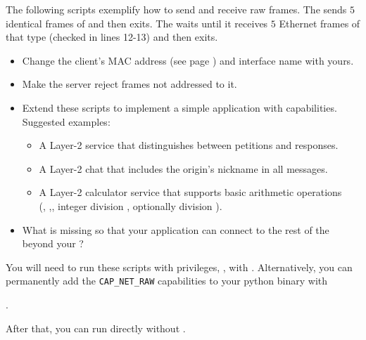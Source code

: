 \begin{exercise}
The following scripts exemplify how to send and receive raw  frames. 
The  sends $5$ identical frames of   and then exits.
The  waits until it receives $5$ Ethernet frames of that type (checked in lines 12-13) and then exits.
% 
\begin{itemize}
\item Change the client's MAC address (see page \pageref{sec:layer2:practical}) and interface name with yours.
\item Make the server reject frames not addressed to it.
\item Extend these scripts to implement a simple application with  capabilities.\\
  Suggested examples:
    \begin{itemize}
    \item A Layer-2  service that distinguishes between petitions and responses.
    \item A Layer-2  chat that includes the origin's nickname in all messages.
    \item A Layer-2 calculator service that supports basic arithmetic operations\\
      (\inlineCode{+}, \inlineCode{-},\inlineCode{*}, integer division \inlineCode{//}, optionally division \inlineCode{/}).
    \end{itemize}
\item What is missing so that your application can connect to the rest of the  beyond your ?
\end{itemize}

\begin{remark}
You will need to run these scripts with privileges, \eg, with .
% 
Alternatively, you can permanently add the \texttt{CAP\_NET\_RAW} capabilities
to your python binary with
\begin{center}
.  
\end{center}
% 
After that, you can run  directly without .\\[-0.5cm]
\end{remark}
\end{exercise}

\begin{center}
\end{center}

\begin{center}
\end{center}
